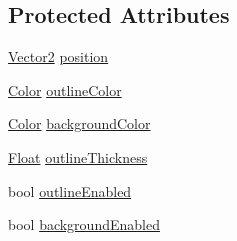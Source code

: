\subsection*{Protected Attributes}
\begin{DoxyCompactItemize}
\item 
\hyperlink{classZeta_1_1Vector2}{Vector2} \hyperlink{classZeta_1_1Shape_ab60c908376dd309194138fe775230e4b}{position}
\item 
\hyperlink{classZeta_1_1Color}{Color} \hyperlink{classZeta_1_1Shape_aaa2b28f381c0230656757fc2fbdb3101}{outline\+Color}
\item 
\hyperlink{classZeta_1_1Color}{Color} \hyperlink{classZeta_1_1Shape_a39c21aac4bc876b13d1d208223ee5d13}{background\+Color}
\item 
\hyperlink{namespaceZeta_a1e0a1265f9b3bd3075fb0fabd39088ba}{Float} \hyperlink{classZeta_1_1Shape_ad7939b5b43a612405ef8807b0202fd64}{outline\+Thickness}
\item 
bool \hyperlink{classZeta_1_1Shape_abc2977287c5a9d23e7feb098efeb2b21}{outline\+Enabled}
\item 
bool \hyperlink{classZeta_1_1Shape_add1c090c91ae81618c02e99c2faa00f4}{background\+Enabled}
\end{DoxyCompactItemize}


